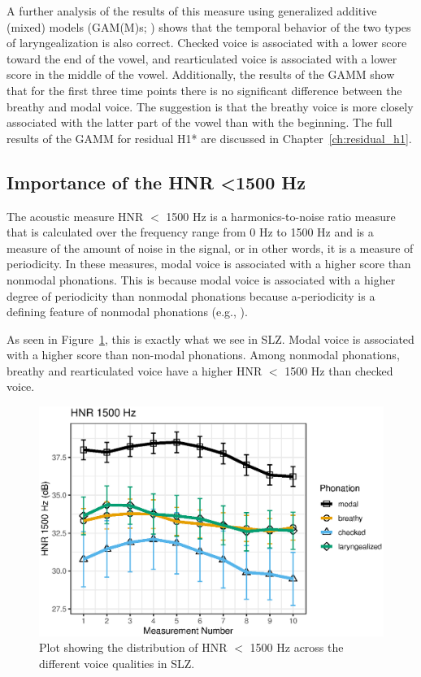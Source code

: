 A further analysis of the results of this measure using generalized additive (mixed) models (GAM(M)s; \cite{hastieGeneralizedAdditiveModels1986,woodGeneralizedAdditiveModels2017,soskuthyGeneralisedAdditiveMixed2017,wielingAnalyzingDynamicPhonetic2018}) shows that the temporal behavior of the two types of laryngealization is also correct. Checked voice is associated with a lower score toward the end of the vowel, and rearticulated voice is associated with a lower score in the middle of the vowel. Additionally, the results of the GAMM show that for the first three time points there is no significant difference between the breathy and modal voice. The suggestion is that the breathy voice is more closely associated with the latter part of the vowel than with the beginning. The full results of the GAMM for residual H1* are discussed in Chapter~\ref{ch:residual_h1}.

\subsection{Importance of the HNR \textless 1500 Hz} \label{sec:bagging_hnr}

The acoustic measure HNR $<$ 1500 Hz is a harmonics-to-noise ratio measure that is calculated over the frequency range from 0 Hz to 1500 Hz and is a measure of the amount of noise in the signal, or in other words, it is a measure of periodicity. In these measures, modal voice is associated with a higher score than nonmodal phonations. This is because modal voice is associated with a higher degree of periodicity than nonmodal phonations because a-periodicity is a defining feature of nonmodal phonations (e.g., \cite{hillenbrandAcousticCorrelatesBreathy1996,blankenshipTimeCourseBreathiness1997,kentVoiceQualityMeasurement1999}).

As seen in Figure~\ref{fig:hnr1500}, this is exactly what we see in SLZ. Modal voice is associated with a higher score than non-modal phonations. Among nonmodal phonations, breathy and rearticulated voice have a higher HNR $<$ 1500 Hz than checked voice. 

\begin{figure}[h!]
    \centering
    \includegraphics[width = 0.9\linewidth]{images/slz_hnr15.eps}
    \caption{Plot showing the distribution of HNR $<$ 1500 Hz across the different voice qualities in SLZ.}
    \label{fig:hnr1500}
\end{figure}

